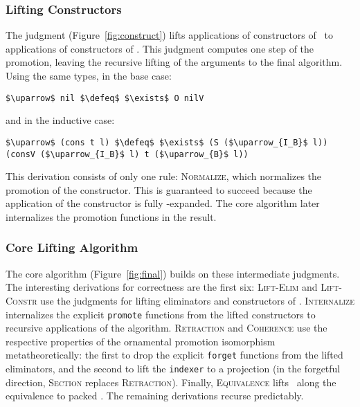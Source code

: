 \subsubsection{Lifting Constructors}
The  judgment (Figure~\ref{fig:construct}) lifts applications of constructors of \Aa\ to applications of constructors of \B. 
This judgment computes one step of the promotion, leaving the recursive lifting of the arguments to the final algorithm. Using the same types, 
in the base case:
\begin{lstlisting}
$\uparrow$ nil $\defeq$ $\exists$ O nilV
\end{lstlisting}
and in the inductive case:
\begin{lstlisting}
$\uparrow$ (cons t l) $\defeq$ $\exists$ (S ($\uparrow_{I_B}$ l)) (consV ($\uparrow_{I_B}$ l) t ($\uparrow_{B}$ l))
\end{lstlisting}
This derivation consists of only one rule: 
\textsc{Normalize}, which normalizes the promotion of the constructor.
This is guaranteed to succeed because the application of the constructor is fully \smallmath{$\eta$}-expanded.
The core algorithm later internalizes the promotion functions in the result.

\subsubsection{Core Lifting Algorithm}
The core algorithm (Figure~\ref{fig:final}) builds on these intermediate judgments.
The interesting derivations for correctness are the first six:
\textsc{Lift-Elim} and \textsc{Lift-Constr} use the judgments for lifting eliminators and constructors of \Aa.
\textsc{Internalize} internalizes the explicit \lstinline{promote} functions from the lifted constructors to recursive applications of the algorithm.
\textsc{Retraction} and \textsc{Coherence} use the respective properties of the ornamental promotion isomorphism metatheoretically:
the first to drop the explicit \lstinline{forget} functions from the lifted eliminators, and the second 
to lift the \lstinline{indexer} to a projection (in the forgetful direction, \textsc{Section} replaces \textsc{Retraction}).
Finally, \textsc{Equivalence} lifts \Aa\ along the equivalence to packed \B.
The remaining derivations recurse predictably.

